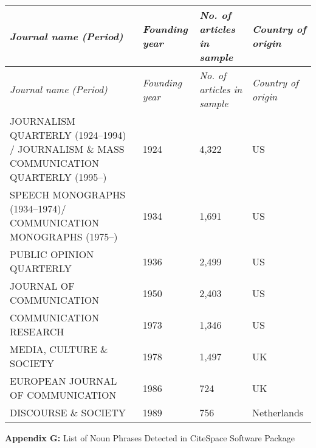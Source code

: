 \documentclass{tufte-handout}
\begin{document}
\begin{hangparas}{.25in}{1}
\begin{fullwidth}
\tabulinesep=1.9mm
{\begin{longtabu} to 1.55\textwidth { X[l] X[c] X[c] X[c]} 
\emph{Journal name (Period)} & \emph{Founding year} & \emph{No. of articles in sample} & \emph{Country of origin}\\
\endfirsthead
\emph{Journal name (Period)} & \emph{Founding year} & \emph{No. of articles in sample} & \emph{Country of origin}\\
\endhead
JOURNALISM QUARTERLY (1924--1994) / JOURNALISM \& MASS COMMUNICATION
QUARTERLY (1995--) & 1924 & 4,322 & US \\
SPEECH MONOGRAPHS (1934--1974)/ COMMUNICATION MONOGRAPHS (1975--) & 1934
& 1,691 & US \\
PUBLIC OPINION QUARTERLY & 1936 & 2,499 & US \\
JOURNAL OF COMMUNICATION & 1950 & 2,403 & US \\
COMMUNICATION RESEARCH & 1973 & 1,346 & US \\
MEDIA, CULTURE \& SOCIETY & 1978 & 1,497 & UK \\
EUROPEAN JOURNAL OF COMMUNICATION & 1986 & 724 & UK \\
DISCOURSE \& SOCIETY & 1989 & 756 & Netherlands \\
\end{longtabu}}


\newpage

\textbf{Appendix G:} List of Noun Phrases Detected in CiteSpace Software
Package

\vspace*{1em}



\end{fullwidth}
\end{hangparas}
\end{document}
